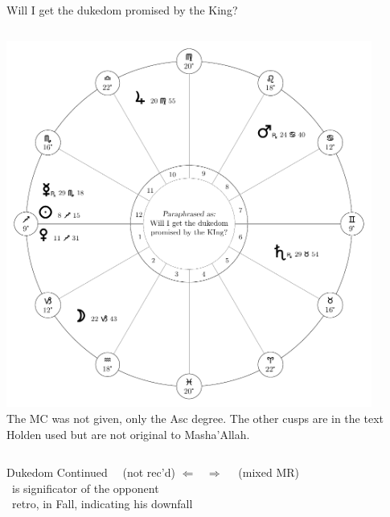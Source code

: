 \begin{frame}[t]{Will I get the dukedom promised by the King?}
\begin{columns}[T, onlytextwidth]
\begin{center}
{\includegraphics[width=0.9\textwidth]{charts/52-chart-dukedom}} \\
\scriptsize
The MC was not given, only the Asc degree. The other cusps are in the text Holden used but are not original to Masha'Allah.
\end{center}
\end{columns}

\end{frame}
\begin{frame}[t]{Dukedom Continued}
\vspace{0.5em}
\Jupiter\ \Trine\ (not rec'd) $\Leftarrow$ \Moon\ $\Rightarrow$ \Opposition\ \Mars\ (mixed MR) \\
\hspace{1em}\Moon\ is significator of the opponent \\
\hspace{1em}\Mars\ retro, in Fall, indicating his downfall\\


\end{frame}